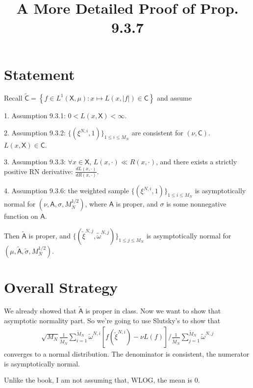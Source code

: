 \documentclass{article}
\title{A More Detailed Proof of Prop. 9.3.7}
\begin{document}
\maketitle


\section{Statement}

Recall $\tilde{\mathsf{C}} = \left\{ f \in L^1(\mathsf{X}, \mu) : x \mapsto L(x, |f|) \in \mathsf{C}  \right\}$ and assume 

1. Assumption 9.3.1: $0 < L(x,\mathsf{X}) < \infty$.

2. Assumption 9.3.2: $\{(\xi^{N,i},1)\}_{1 \le i \le M_N}$ are consistent for $(\nu, \mathsf{C})$. $L(x,\mathsf{X}) \in \mathsf{C}$.

3. Assumption 9.3.3: $\forall x \in \mathsf{X}$, $L(x, \cdot) \ll R(x, \cdot)$, and there exists a strictly positive RN derivative: $\frac{dL(x,\cdot )}{dR(x, \cdot)}$.

4. Assumption 9.3.6: the weighted sample $\{(\xi^{N,i}, 1)\}_{1 \le i \le M_N}$ is asymptotically normal for $(\nu, \mathsf{A}, \sigma, M_N^{1/2})$, where $\mathsf{A}$ is proper, and $\sigma$ is some nonnegative function on $\mathsf{A}$.

Then $\tilde{\mathsf{A}}$ is proper, and $\{ (\tilde{\xi}^{N,j}, \tilde{\omega}^{N,j} )\}_{1 \le j \le M_N}$ is asymptotically normal for $(\mu, \tilde{\mathsf{A}}, \tilde{\sigma}, M_N^{1/2})$.





\section{Overall Strategy}

We already showed that $\tilde{\mathsf{A}}$ is proper in class. Now we want to show that asymptotic normality part. So we're going to use Slutsky's to show that
\begin{align*}
\sqrt{M_N} \frac{1}{\tilde{M}_N} \sum_{i=1}^{\tilde{M}_N} \tilde{\omega}^{N,i}\left[ f(\tilde{\xi}^{N,i}) - \nu L(f) \right]
\bigg/ \frac{1}{\tilde{M}_N} \sum_{j=1}^{\tilde{M}_N} \tilde{\omega}^{N,j}
\end{align*}
converges to a normal distribution. The denominator is consistent, the numerator is asymptotically normal.

Unlike the book, I am not assuming that, WLOG, the mean is $0$.
\end{document}
